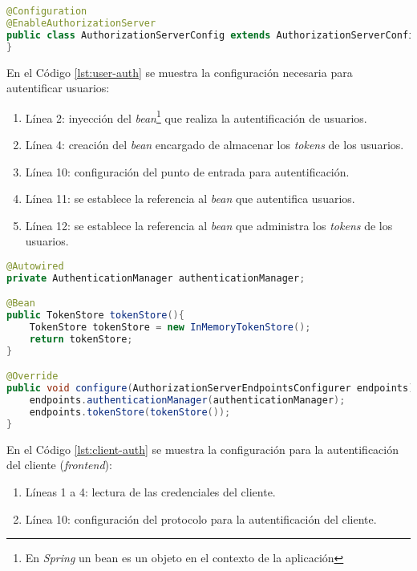 \begin{enumerate}
\begin{lstlisting}[language=Java, caption={Clase de autentificación de usuarios.}, captionpos=b, label={lst:enable-auth-server}]
@Configuration
@EnableAuthorizationServer
public class AuthorizationServerConfig extends AuthorizationServerConfigurerAdapter{
}
\end{lstlisting}

	En el Código \ref{lst:user-auth} se muestra la configuración necesaria para autentificar usuarios:
	\begin{enumerate}
		\item Línea 2: inyección del \textit{bean}\footnote{En \textit{Spring} un bean es un objeto en el contexto de la aplicación\cite{SpringInAction}} que realiza la autentificación de usuarios.
		\item Línea 4: creación del \textit{bean} encargado de almacenar los \textit{tokens} de los usuarios.
		\item Línea 10: configuración del punto de entrada para autentificación.
		\item Línea 11: se establece la referencia al \textit{bean} que autentifica usuarios.
		\item Línea 12: se establece la referencia al \textit{bean} que administra los \textit{tokens} de los usuarios.
	\end{enumerate}

\begin{lstlisting}[language=Java, caption={Configuración de autentificación de usuarios.}, captionpos=b, label={lst:user-auth}]
@Autowired
private AuthenticationManager authenticationManager;

@Bean
public TokenStore tokenStore(){
	TokenStore tokenStore = new InMemoryTokenStore();
	return tokenStore;
}

@Override
public void configure(AuthorizationServerEndpointsConfigurer endpoints) throws Exception{
	endpoints.authenticationManager(authenticationManager);
	endpoints.tokenStore(tokenStore());
}
\end{lstlisting}

	En el Código \ref{lst:client-auth} se muestra la configuración para la autentificación del cliente (\textit{frontend}):

	\begin{enumerate}
		\item Líneas 1 a 4: lectura de las credenciales del cliente.
		\item Línea 10: configuración del protocolo para la autentificación del cliente. 
	\end{enumerate}


\end{enumerate}

